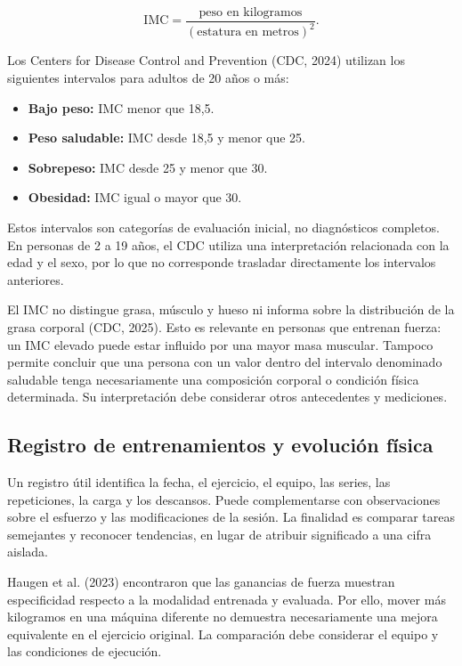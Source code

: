 \begin{equation}
    \mathrm{IMC}=\frac{\text{peso en kilogramos}}{(\text{estatura en metros})^{2}}.
    \label{eq:imc-area}
\end{equation}

Los Centers for Disease Control and Prevention (CDC, 2024) utilizan los siguientes intervalos para adultos de 20 años o más:

\begin{itemize}
    \item \textbf{Bajo peso:} IMC menor que 18,5.
    \item \textbf{Peso saludable:} IMC desde 18,5 y menor que 25.
    \item \textbf{Sobrepeso:} IMC desde 25 y menor que 30.
    \item \textbf{Obesidad:} IMC igual o mayor que 30.
\end{itemize}

Estos intervalos son categorías de evaluación inicial, no diagnósticos completos. En personas de 2 a 19 años, el CDC utiliza una interpretación relacionada con la edad y el sexo, por lo que no corresponde trasladar directamente los intervalos anteriores.

El IMC no distingue grasa, músculo y hueso ni informa sobre la distribución de la grasa corporal (CDC, 2025). Esto es relevante en personas que entrenan fuerza: un IMC elevado puede estar influido por una mayor masa muscular. Tampoco permite concluir que una persona con un valor dentro del intervalo denominado saludable tenga necesariamente una composición corporal o condición física determinada. Su interpretación debe considerar otros antecedentes y mediciones.

\subsection{Registro de entrenamientos y evolución física}

Un registro útil identifica la fecha, el ejercicio, el equipo, las series, las repeticiones, la carga y los descansos. Puede complementarse con observaciones sobre el esfuerzo y las modificaciones de la sesión. La finalidad es comparar tareas semejantes y reconocer tendencias, en lugar de atribuir significado a una cifra aislada.

Haugen et al. (2023) encontraron que las ganancias de fuerza muestran especificidad respecto a la modalidad entrenada y evaluada. Por ello, mover más kilogramos en una máquina diferente no demuestra necesariamente una mejora equivalente en el ejercicio original. La comparación debe considerar el equipo y las condiciones de ejecución.

